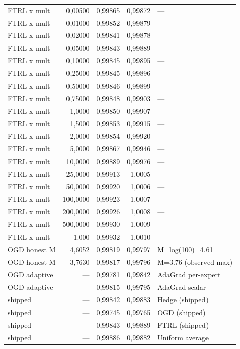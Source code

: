 {\begin{longtable}{@{}lrrrl@{}}
FTRL x mult & 0,00500 & 0,99865 & 0,99872 & --- \\
FTRL x mult & 0,01000 & 0,99852 & 0,99879 & --- \\
FTRL x mult & 0,02000 & 0,99841 & 0,99878 & --- \\
FTRL x mult & 0,05000 & 0,99843 & 0,99889 & --- \\
FTRL x mult & 0,10000 & 0,99845 & 0,99895 & --- \\
FTRL x mult & 0,25000 & 0,99845 & 0,99896 & --- \\
FTRL x mult & 0,50000 & 0,99846 & 0,99899 & --- \\
FTRL x mult & 0,75000 & 0,99848 & 0,99903 & --- \\
FTRL x mult & 1,0000 & 0,99850 & 0,99907 & --- \\
FTRL x mult & 1,5000 & 0,99853 & 0,99915 & --- \\
FTRL x mult & 2,0000 & 0,99854 & 0,99920 & --- \\
FTRL x mult & 5,0000 & 0,99867 & 0,99946 & --- \\
FTRL x mult & 10,0000 & 0,99889 & 0,99976 & --- \\
FTRL x mult & 25,0000 & 0,99913 & 1,0005 & --- \\
FTRL x mult & 50,0000 & 0,99920 & 1,0006 & --- \\
FTRL x mult & 100,0000 & 0,99923 & 1,0007 & --- \\
FTRL x mult & 200,0000 & 0,99926 & 1,0008 & --- \\
FTRL x mult & 500,0000 & 0,99930 & 1,0009 & --- \\
FTRL x mult & 1.000 & 0,99932 & 1,0010 & --- \\
OGD honest M & 4,6052 & 0,99819 & 0,99797 & M=log(100)=4.61 \\
OGD honest M & 3,7630 & 0,99817 & 0,99796 & M=3.76 (observed max) \\
OGD adaptive & --- & 0,99781 & 0,99842 & AdaGrad per-expert \\
OGD adaptive & --- & 0,99815 & 0,99795 & AdaGrad scalar \\
shipped & --- & 0,99842 & 0,99883 & Hedge (shipped) \\
shipped & --- & 0,99745 & 0,99765 & OGD (shipped) \\
shipped & --- & 0,99843 & 0,99889 & FTRL (shipped) \\
shipped & --- & 0,99886 & 0,99882 & Uniform average \\
\end{longtable}
}

